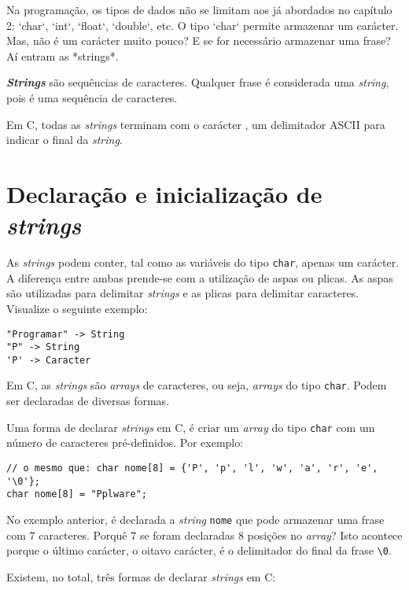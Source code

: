 Na programação, os tipos de dados não se limitam aos já abordados no capítulo 2: `char`, `int`, `float`, `double`, etc. O tipo `char` permite armazenar um carácter. Mas, não é um carácter muito pouco? E se for necessário armazenar uma frase? Aí entram as *strings*.

\begin{defi}
\textbf{\textit{Strings}} são sequências de caracteres. Qualquer frase é considerada uma \textit{string}, pois é uma sequência de caracteres.
\end{defi}

Em C, todas as \textit{strings} terminam com o carácter , um delimitador ASCII para indicar o final da \textit{string}.

\section{Declaração e inicialização de \textit{strings}}

As \textit{strings} podem conter, tal como as variáveis do tipo \texttt{char}, apenas um carácter. A diferença entre ambas prende-se com a utilização de aspas ou plicas. As aspas são utilizadas para delimitar \textit{strings} e as plicas para delimitar caracteres. Visualize o seguinte exemplo:

\begin{lstlisting}
"Programar" -> String
"P" -> String
'P' -> Caracter
\end{lstlisting}

Em C, as \textit{strings} são \textit{arrays} de caracteres, ou seja, \textit{arrays} do tipo \texttt{char}. Podem ser declaradas de diversas formas.

Uma forma de declarar \textit{strings} em C, é criar um \textit{array} do tipo \texttt{char} com um número de caracteres pré-definidos. Por exemplo:

\begin{lstlisting}
// o mesmo que: char nome[8] = {'P', 'p', 'l', 'w', 'a', 'r', 'e', '\0'};
char nome[8] = "Pplware";
\end{lstlisting}

No exemplo anterior, é declarada a \textit{string} \texttt{nome} que pode armazenar uma frase com 7 caracteres. Porquê 7 se foram declaradas 8 posições no \textit{array}? Isto acontece porque o último carácter, o oitavo carácter, é o delimitador do final da frase \texttt{\textbackslash 0}.

Existem, no total, três formas de declarar \textit{strings} em C: 

